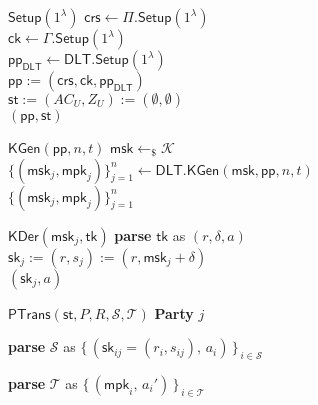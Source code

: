 \begin{minipage}[t]{0.49\textwidth}

\begin{algo}{$\mathsf{Setup}(1^\lambda)$}
$\mathsf{crs} \leftarrow \Pi.\mathsf{Setup}(1^\lambda)$ \\
$\mathsf{ck} \leftarrow \Gamma.\mathsf{Setup}(1^\lambda)$ \\
$\mathsf{pp}_{\mathsf{DLT}} \leftarrow \mathsf{DLT.Setup}(1^\lambda)$ \\
$\mathsf{pp} := (\mathsf{crs}, \mathsf{ck}, \mathsf{pp}_{\mathsf{DLT}})$ \\
$\mathsf{st} := (AC_U, Z_U) := (\emptyset,\emptyset)$\\
\Return $(\mathsf{pp}, \mathsf{st})$
\end{algo}

\begin{algo}{$\mathsf{KGen}(\mathsf{pp},n, t)$}
$\mathsf{msk} \gets_{\$}{\mathcal K}$\\
$\{(\mathsf{msk}_j,\mathsf{mpk}_j)\}_{j=1}^{n} \gets \mathsf{DLT.KGen}(\mathsf{msk},\mathsf{pp},n, t)$\\
\Return $\{(\mathsf{msk}_j,\mathsf{mpk}_j)\}_{j=1}^{n} $
\end{algo}

\begin{algo}{$\mathsf{KDer}(\mathsf{msk}_j, \mathsf{tk})$}
\textbf{parse} $\mathsf{tk}$ as $(r,\delta, a)$\\
$\mathsf{sk}_j := (r,s_j):=(r,\mathsf{msk}_j+\delta)$ \\
\Return $(\mathsf{sk}_j,a)$
\end{algo}

\begin{algo}{$\mathsf{PTrans}(\mathsf{st},P,R,\mathcal{S},\mathcal{T})$}
\textbf{Party} $j$\;

\textbf{parse} $\mathcal{S}$ as $\{\,(\mathsf{sk}_{ij}=(r_i,s_{ij}),\,a_i)\,\}_{\,i\in \mathcal{S}}\;$

\textbf{parse} $\mathcal{T}$ as $\{\,(\mathsf{mpk}_i,\,a_i')\,\}_{\,i\in \mathcal{T}}\;$

\end{algo}
\end{minipage}
